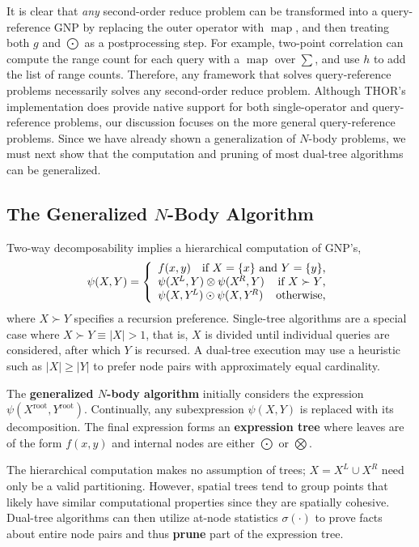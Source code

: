 \documentclass[twoside,leqno,twocolumn]{article}
\newcommand{\union}{\cup}
\newcommand{\prefsplit}[2]{#1 \succ #2}
\DeclareMathOperator*{\map}{map}
\newcommand{\gnp}{\psi}
\newcommand{\mysub}[1]{\subsection{#1} }
\newcommand{\defterm}[1]{{\bf #1}}
\newcommand{\kdroot}[1]{#1^{\text{root}}}
\newcommand{\kdleft}[1]{#1^{\!L}}
\newcommand{\kdright}[1]{#1^{\!R}}
\newcommand{\outstat}{\sigma}
\begin{document}
It is clear that {\em any} second-order reduce problem can be transformed into a query-reference GNP by replacing the outer operator with $\map$, and then treating both $g$ and $\bigodot$ as a postprocessing step.
For example, two-point correlation can compute the range count for each query with a $\map$ over $\sum$, and use $h$ to add the list of range counts.
Therefore, any framework that solves query-reference problems necessarily solves any second-order reduce problem.
Although THOR's implementation does provide native support for both single-operator and query-reference problems, our discussion focuses on the more general query-reference problems.
Since we have already shown a generalization of $N$-body problems, we must next show that the computation and pruning of most dual-tree algorithms can be generalized.

\mysub{The Generalized $N$-Body Algorithm}
Two-way decomposability implies a hierarchical computation of GNP's,
\[
\gnp(X,Y) = \left\{ \begin{array}{lrr}
    f(x,y) & \multicolumn{2}{r}{\text{if }X = \{x\}\text{ and }Y = \{y\}\text{,}}
    \\
    \multicolumn{2}{l}{\gnp(\kdleft{X},Y) \otimes \gnp(\kdright{X}, Y)} & \text{if }\prefsplit{X}{Y}\text{,}
    \\
    \multicolumn{2}{l}{\gnp(X,\kdleft{Y}) \odot \gnp(X,\kdright{Y})} & \text{otherwise,}
  \end{array}
\right.
\]
\noindent
where $\prefsplit{X}{Y}$ specifies a recursion preference.
Single-tree algorithms are a special case where $\prefsplit{X}{Y} \equiv |X| > 1$, that is, $X$ is divided until individual queries are considered, after which $Y$ is recursed.
A dual-tree execution may use a heuristic such as $|X| \geq |Y|$ to prefer node pairs with approximately equal cardinality.

The \defterm{generalized $N$-body algorithm} initially considers the expression $\gnp(\kdroot{X}, \kdroot{Y})$.
Continually, any subexpression $\gnp(X, Y)$ is replaced with its decomposition.
The final expression forms an \defterm{expression tree} where leaves are of the form $f(x,y)$ and internal nodes are either $\bigodot$ or $\bigotimes$.

The hierarchical computation makes no assumption of trees; $X = \kdleft{X} \union \kdright{X}$ need only be a valid partitioning.
However, spatial trees tend to group points that likely have similar computational properties since they are spatially cohesive.
Dual-tree algorithms can then utilize at-node statistics $\outstat(\cdot)$ to prove facts about entire node pairs and thus \defterm{prune} part of the expression tree.
\end{document}
